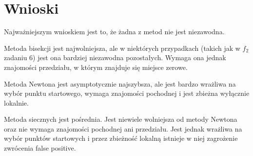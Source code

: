 \documentclass{article}
\begin{document}
\section*{Wnioski}
Najważniejszym wnioskiem jest to, że żadna z metod
nie jest niezawodna.

Metoda bisekcji jest najwolniejsza,
ale w niektórych przypadkach (takich jak w $f_2$ zadaniu 6)
jest ona bardziej niezawodna pozostałych.
Wymaga ona jednak znajomości przedziału, w którym znajduje się
miejsce zerowe.

Metoda Newtona
jest asymptotycznie najszybsza, ale jest bardzo wrażliwa
na wybór punktu startowego, wymaga znajomości pochodnej i
jest zbieżna wyłącznie lokalnie.

Metoda siecznych jest pośrednia. Jest niewiele wolniejsza
od metody Newtona oraz nie wymaga znajomości pochodnej ani przedziału.
Jest jednak wrażliwa na wybór punktów startowych i przez zbieżność lokalną
istnieje w niej zagrożenie zwrócenia false positive.
\end{document}
